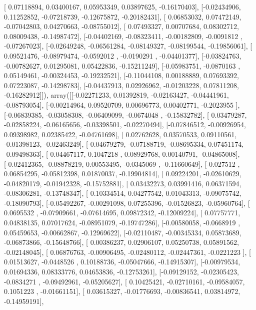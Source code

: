 \documentclass{article}
\begin{document}
       [ 0.07118894,  0.03400167,  0.05953349,  0.03897625, -0.16170403],
       [-0.02434906,  0.11252852, -0.07218739, -0.12675872, -0.20182431],
       [ 0.06853032,  0.07472149, -0.07042803,  0.04270663, -0.08755012],
       [ 0.07493327,  0.00707684,  0.08302712,  0.08009438, -0.14987472],
       [-0.04402169, -0.08323411, -0.00182809, -0.0091812 , -0.07267023],
       [-0.02649248, -0.06561284, -0.08149327, -0.08199544, -0.19856061],
       [ 0.09521476, -0.08979474, -0.0592012 , -0.0190291 , -0.04401377],
       [-0.03824763, -0.00782627,  0.01295081,  0.05422836, -0.15211249],
       [-0.05983751, -0.0870163 ,  0.05149461, -0.00324453, -0.19232521],
       [-0.11044108,  0.00188889,  0.07693392,  0.07223087, -0.14298783],
       [-0.04437913,  0.02926962, -0.01203228,  0.07811208, -0.16282912]]), array([[-0.02271233,  0.01392819, -0.02163427, -0.04441961, -0.08793054],
       [-0.00214964,  0.09520709,  0.00696773,  0.00402771, -0.2023955 ],
       [-0.06839385, -0.03058308, -0.06409099, -0.0674048 , -0.15832782],
       [ 0.03479287, -0.02858224, -0.06165656, -0.03398501, -0.02270494],
       [-0.07846512, -0.00926954,  0.09398982,  0.02385422, -0.04761698],
       [ 0.02762628,  0.03570533,  0.09110561, -0.01398123, -0.02463249],
       [-0.04679279, -0.07188719, -0.08695334,  0.07451174, -0.09498363],
       [-0.04467117,  0.1047218 ,  0.08929768,  0.00140791, -0.04865008],
       [-0.02412365, -0.08878219,  0.00553495, -0.0345069 , -0.11660649],
       [-0.027512  ,  0.06854295, -0.05812398,  0.01870037, -0.19904814],
       [ 0.09224201, -0.02610629, -0.04820179, -0.01942328, -0.15752881],
       [ 0.03432273,  0.03991416,  0.06371594, -0.08306281, -0.13748347],
       [ 0.10334514,  0.04277542,  0.01043313, -0.09075742, -0.18090793],
       [-0.05492267, -0.00291098,  0.07255396, -0.01526823, -0.05960764],
       [ 0.0695532 , -0.07909661, -0.07614695,  0.09872342, -0.12009224],
       [ 0.07757771,  0.04838135,  0.07017624, -0.08951079, -0.19747286],
       [-0.00580058, -0.0668919 ,  0.05459653, -0.00662867, -0.12969622],
       [-0.02110487, -0.00345334,  0.05873689, -0.06873866, -0.15648766],
       [ 0.00386237,  0.02906107,  0.05250738,  0.05891562, -0.02148045],
       [ 0.06876763, -0.00906495, -0.02480112, -0.02447361, -0.0221223 ],
       [ 0.01513627, -0.0448526 ,  0.10188736, -0.05047666, -0.14915307],
       [-0.00979534,  0.01694336,  0.08333776,  0.04653836, -0.12753261],
       [-0.09129152, -0.02305423, -0.0834271 , -0.09492961, -0.05205627],
       [ 0.10425421, -0.02710161, -0.09584057,  0.1051223 , -0.01661151],
       [ 0.03615327, -0.01776693, -0.00836541,  0.03814972, -0.14959191],
\end{document}
